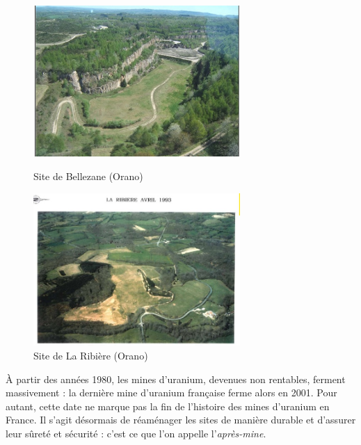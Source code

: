 \documentclass{article}
\begin{document}

\begin{figure}[H]
    \centering
    \begin{minipage}{0.5\textwidth}
        \centering
        \includegraphics[width=0.7\textwidth]{I_A_3.jpg} 
        \caption{Site de Bellezane (Orano)}
        \label{fig:bellezane1}
    \end{minipage}\hfill
    \begin{minipage}{0.5\textwidth}
        \centering
        \includegraphics[width=0.7\textwidth]{I_A_4.jpg} 
        \caption{Site de La Ribière (Orano)}
        \label{fig:ribiere1}
    \end{minipage}
\end{figure}


À partir des années 1980, les mines d’uranium, devenues non rentables, ferment massivement : la dernière mine d’uranium française ferme alors en 2001. Pour autant, cette date ne marque pas la fin de l’histoire des mines d’uranium en France. Il s’agit désormais de réaménager les sites de manière durable et d'assurer leur sûreté et sécurité : c’est ce que l’on appelle l’\emph{après-mine}.
\end{document}
